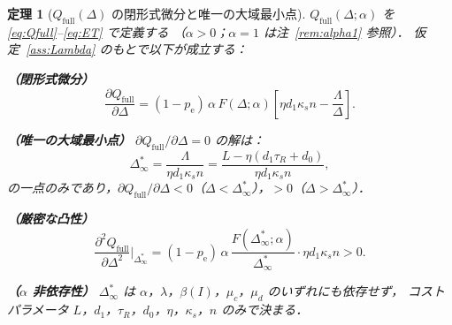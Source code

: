 \documentclass[12pt,a4paper]{article}
\theoremstyle{plain}
\newtheorem{theorem}{定理}[section]
\theoremstyle{definition}
\theoremstyle{remark}
\newcommand{\pe}{p_{\mathrm{e}}}
\newcommand{\Qf}{Q_{\mathrm{full}}}
\newcommand{\betaI}{\beta(I)}
\newcommand{\Dinf}{\Delta^{*}_{\infty}}
\newcommand{\La}{\Lambda}
\begin{document}
\begin{theorem}[$\Qf(\Delta)$ の閉形式微分と唯一の大域最小点]\label{thm:dQ}
$\Qf(\Delta;\alpha)$ を \eqref{eq:Qfull}--\eqref{eq:ET} で定義する
（$\alpha>0$；$\alpha=1$ は注~\ref{rem:alpha1} 参照）．
仮定~\ref{ass:Lambda} のもとで以下が成立する：

\noindent\textbf{（閉形式微分）}
\begin{equation}\label{eq:dQfull}
\frac{\partial\Qf}{\partial\Delta}
=(1-\pe)\,\alpha\,F(\Delta;\alpha)\left[\eta d_1\kappa_s n-\frac{\La}{\Delta}\right].
\end{equation}

\noindent\textbf{（唯一の大域最小点）}
$\partial\Qf/\partial\Delta=0$ の解は：
\begin{equation}\label{eq:Dinf}
\Dinf
=\frac{\La}{\eta d_1\kappa_s n}
=\frac{L-\eta(d_1\tau_R+d_0)}{\eta d_1\kappa_s n},
\end{equation}
の一点のみであり，$\partial\Qf/\partial\Delta<0$（$\Delta<\Dinf$），$>0$（$\Delta>\Dinf$）．

\noindent\textbf{（厳密な凸性）}
\begin{equation}\label{eq:d2Qfull}
\frac{\partial^2\Qf}{\partial\Delta^2}\bigg|_{\Dinf}
=(1-\pe)\,\alpha\,\frac{F(\Dinf;\alpha)}{\Dinf}\cdot\eta d_1\kappa_s n>0.
\end{equation}

\noindent\textbf{（$\alpha$ 非依存性）}
$\Dinf$ は $\alpha$，$\lambda$，$\betaI$，$\mu_c$，$\mu_d$ のいずれにも依存せず，
コストパラメータ $L$，$d_1$，$\tau_R$，$d_0$，$\eta$，$\kappa_s$，$n$ のみで決まる．
\end{theorem}
\end{document}
